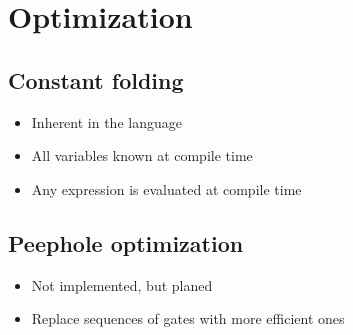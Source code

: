 \section{Optimization}
\subsection{Constant folding}
\begin{itemize}
    \item Inherent in the language
    \item All variables known at compile time
    \item Any expression is evaluated at compile time
\end{itemize}
\subsection{Peephole optimization}
\begin{itemize}
    \item Not implemented, but planed
    \item Replace sequences of gates with more efficient ones
\end{itemize}
